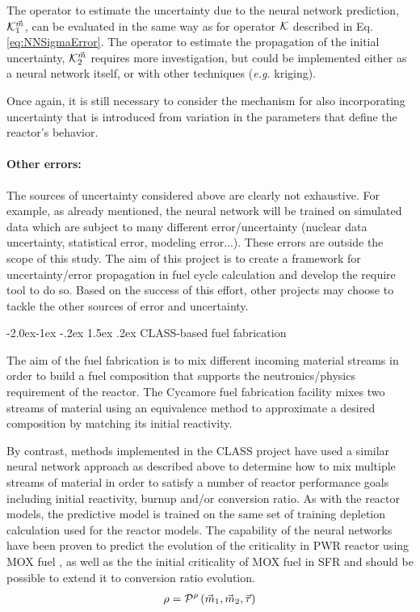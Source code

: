 \documentclass[dvips,11pt]{article}
\makeatletter
\renewcommand\subsubsection{\@startsection{subsubsection}{3}{\z@}%
                                     {-2.0ex\@plus -1ex \@minus -.2ex}%
                                     {1.5ex \@plus .2ex}%
                                     {\normalfont\bfseries}}%
\makeatother
\begin{document}
The operator to estimate the uncertainty due to
the neural network prediction, ${\cal
  K}_1^{{\vec{m}}}$, can be evaluated in the same way
as for operator ${\cal K}$ described in
Eq.\eqref{eq:NNSigmaError}. The operator to estimate
the propagation of the initial uncertainty,
${\cal K}_2^{{\vec{m}}}$ requires more investigation,
but could be implemented either as a neural
network itself, or with other techniques
(\textit{e.g.} kriging).

Once again, it is still necessary to consider the
mechanism for also incorporating uncertainty that
is introduced from variation in the parameters
that define the reactor's behavior.

\paragraph{Other errors:\\}

The sources of uncertainty considered above are
clearly not exhaustive. For example, as already
mentioned, the neural network will be trained on
simulated data which are subject to many different
error/uncertainty (nuclear data uncertainty,
statistical error, modeling error...).  These
errors are outside the scope of this study.  The
aim of this project is to create a framework for
uncertainty/error propagation in fuel cycle
calculation and develop the require tool to do so.
Based on the success of this effort, other
projects may choose to tackle the other sources of
error and uncertainty.

\subsubsection{CLASS-based fuel fabrication} \label{sec:fabrication}

The aim of the fuel fabrication is to mix
different incoming material streams in order to
build a fuel composition that supports the
neutronics/physics requirement of the reactor. The
Cycamore fuel fabrication facility mixes two
streams of material using an equivalence method to
approximate a desired composition by matching its
initial reactivity.  \cite{cycamore_fab}

By contrast, methods implemented in the CLASS
project have used a similar neural network
approach as described above to determine how to
mix multiple streams of material in order to
satisfy a number of reactor performance goals
including initial reactivity, burnup and/or
conversion ratio. As with the reactor models, the
predictive model is trained on the same set of
training depletion calculation used for the
reactor models. The capability of the neural
networks have been proven to predict the evolution
of the criticality in PWR reactor using MOX fuel
\cite{Leniau.ANE.2015}, as well as
the the initial criticality of MOX fuel in SFR
\cite{CLASS_UserGuide} and should be possible to
extend it to conversion ratio evolution.
\begin{align}
  \rho = {\cal P}^{\rho}\left( \vec{m}_{1},\vec{m}_{2}, \vec{\tau} \right)
\end{align}
\end{document}
